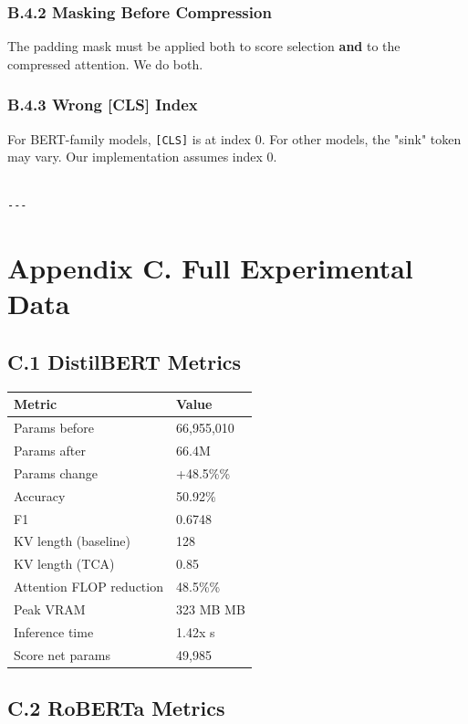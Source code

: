 \subsubsection{B.4.2 Masking Before Compression}

The padding mask must be applied both to score selection \textbf{and} to the 
compressed attention. We do both.

\subsubsection{B.4.3 Wrong [CLS] Index}

For BERT-family models, \texttt{[CLS]} is at index 0. For other models, the "sink" 
token may vary. Our implementation assumes index 0.
\begin{lstlisting}

---
\end{lstlisting}

\section{Appendix C. Full Experimental Data}

\subsection{C.1 DistilBERT Metrics}

\begin{table}[H]
\centering
\small
\begin{tabular}{ll}
\toprule
\textbf{Metric} & \textbf{Value} \\
\midrule
Params before & 66,955,010 \\
Params after & 66.4M \\
Params change & +48.5\%\% \\
Accuracy & 50.92\% \\
F1 & 0.6748 \\
KV length (baseline) & 128 \\
KV length (TCA) & 0.85 \\
Attention FLOP reduction & 48.5\%\% \\
Peak VRAM & 323 MB MB \\
Inference time & 1.42x s \\
Score net params & 49,985 \\
\bottomrule
\end{tabular}
\end{table}

\subsection{C.2 RoBERTa Metrics}

